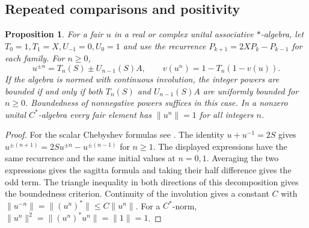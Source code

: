 \documentclass[11pt,reqno]{amsart}
\newtheorem{proposition}[theorem]{Proposition}
\theoremstyle{definition}
\theoremstyle{remark}
\numberwithin{equation}{section}
\begin{document}
\subsection{Repeated comparisons and positivity}

\begin{proposition}\label{m1:chebyshev}
For a fair \(u\) in a real or complex unital associative \(*\)-algebra,
let \(T_0=1,T_1=X,U_{-1}=0,U_0=1\) and use the recurrence
\(P_{k+1}=2XP_k-P_{k-1}\) for each family. For \(n\ge0\),
\begin{equation}\label{m1:cheb-eq}
 u^{\pm n}=T_n(S)\pm U_{n-1}(S)A,\qquad
 v(u^n)=1-T_n(1-v(u)).
\end{equation}
If the algebra is normed with continuous involution, the integer powers
are bounded if and only if both \(T_n(S)\) and \(U_{n-1}(S)A\) are
uniformly bounded for \(n\ge0\). Boundedness of nonnegative powers
suffices in this case. In a nonzero unital \(C^*\)-algebra every fair
element has \(\|u^n\|=1\) for all integers \(n\).
\end{proposition}
\begin{proof}
For the scalar Chebyshev formulas see \cite[\S18.5(i)]{m1:DLMF}.
The identity \(u+u^{-1}=2S\) gives
\(u^{\pm(n+1)}=2Su^{\pm n}-u^{\pm(n-1)}\) for \(n\ge1\).
The displayed expressions have the same recurrence and the same
initial values at \(n=0,1\). Averaging the two expressions gives the
sagitta formula and taking their half difference gives the odd term.
The triangle inequality in both directions of this decomposition gives
the boundedness criterion. Continuity of the involution gives a
constant \(C\) with \(\|u^{-n}\|=\|(u^n)^*\|\le C\|u^n\|\).
For a \(C^*\)-norm, \(\|u^n\|^2=\|(u^n)^*u^n\|=\|1\|=1\).
\end{proof}
\end{document}
